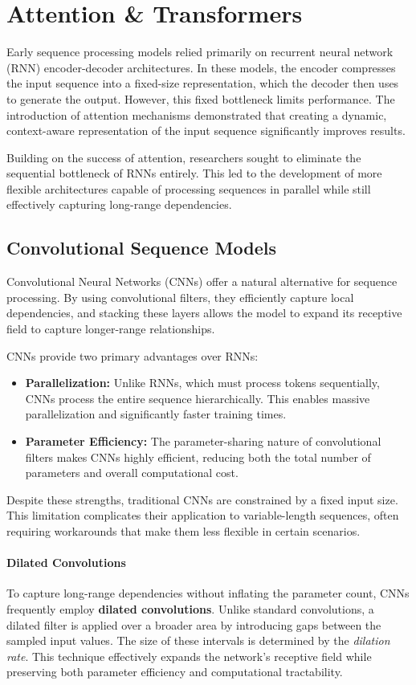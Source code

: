 \section{Attention \& Transformers}
Early sequence processing models relied primarily on recurrent neural network (RNN) encoder-decoder architectures. 
In these models, the encoder compresses the input sequence into a fixed-size representation, which the decoder then uses to generate the output. 
However, this fixed bottleneck limits performance. The introduction of attention mechanisms demonstrated that creating a dynamic, context-aware representation of the input sequence significantly improves results. 

Building on the success of attention, researchers sought to eliminate the sequential bottleneck of RNNs entirely. 
This led to the development of more flexible architectures capable of processing sequences in parallel while still effectively capturing long-range dependencies.

\subsection{Convolutional Sequence Models}
Convolutional Neural Networks (CNNs) offer a natural alternative for sequence processing. 
By using convolutional filters, they efficiently capture local dependencies, and stacking these layers allows the model to expand its receptive field to capture longer-range relationships.

CNNs provide two primary advantages over RNNs:
\begin{itemize}
    \item \textbf{Parallelization:} Unlike RNNs, which must process tokens sequentially, CNNs process the entire sequence hierarchically. 
    This enables massive parallelization and significantly faster training times.
    
    \item \textbf{Parameter Efficiency:} The parameter-sharing nature of convolutional filters makes CNNs highly efficient, 
    reducing both the total number of parameters and overall computational cost.
\end{itemize}

Despite these strengths, traditional CNNs are constrained by a fixed input size. This limitation complicates their application 
to variable-length sequences, often requiring workarounds that make them less flexible in certain scenarios.

\paragraph{Dilated Convolutions}
To capture long-range dependencies without inflating the parameter count, CNNs frequently employ \textbf{dilated convolutions}. 
Unlike standard convolutions, a dilated filter is applied over a broader area by introducing gaps between the sampled input values. 
The size of these intervals is determined by the \textit{dilation rate}. This technique effectively expands the network's receptive field while preserving both parameter efficiency and computational tractability.

